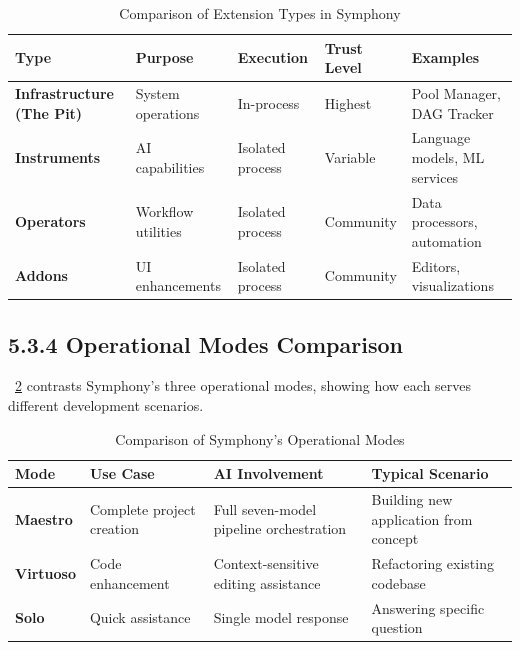 \begin{table}[H]
\caption{Comparison of Extension Types in Symphony}
\label{tab:extension-types}
\centering
\small
\begin{tabular}{@{}p{2.5cm}p{3cm}p{3cm}p{3cm}p{2cm}@{}}
\toprule
\textbf{Type} & \textbf{Purpose} & \textbf{Execution} & \textbf{Trust Level} & \textbf{Examples} \\
\midrule
\textbf{Infrastructure (The Pit)} & System operations & In-process & Highest & Pool Manager, DAG Tracker \\
\midrule
\textbf{Instruments} & AI capabilities & Isolated process & Variable & Language models, ML services \\
\midrule
\textbf{Operators} & Workflow utilities & Isolated process & Community & Data processors, automation \\
\midrule
\textbf{Addons} & UI enhancements & Isolated process & Community & Editors, visualizations \\
\bottomrule
\end{tabular}
\end{table}

\subsection*{5.3.4 Operational Modes Comparison}

~\ref{tab:operational-modes} contrasts Symphony's three operational modes, showing how each serves different development scenarios.

\begin{table}[H]
\caption{Comparison of Symphony's Operational Modes}
\label{tab:operational-modes}
\centering
\small
\begin{tabular}{@{}p{2.5cm}p{3.5cm}p{4cm}p{4cm}@{}}
\toprule
\textbf{Mode} & \textbf{Use Case} & \textbf{AI Involvement} & \textbf{Typical Scenario} \\
\midrule
\textbf{Maestro} & Complete project creation & Full seven-model pipeline orchestration & Building new application from concept \\
\midrule
\textbf{Virtuoso} & Code enhancement & Context-sensitive editing assistance & Refactoring existing codebase \\
\midrule
\textbf{Solo} & Quick assistance & Single model response & Answering specific question \\
\bottomrule
\end{tabular}
\end{table}

